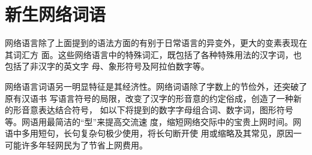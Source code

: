 \section{新生网络词语}

网络语言除了上面提到的语法方面的有别于日常语言的异变外，更大的变素表现在其词汇方
面。这些网络语言中的特殊词汇，既包括了各种特殊用法的汉字词，也包括了非汉字的英文字
母、象形符号及阿拉伯数字等。

网络语言词语另一明显特征是其经济性。网络词语除了字数上的节俭外，还突破了原有汉语书
写语言符号的局限，改变了汉字的形音意的约定俗成，创造了一种新的形音意表达结合符号，
如以下将提到的数字字母组合词、数字词，图形符号等。网语用最简洁的“型”来提高交流速
度，缩短网络交际中的宝贵上网时间。网语中多用短句，长句复杂句极少使用，将长句断开使
用或缩略及其常见，原因一可能许多年轻网民为了节省上网费用。

